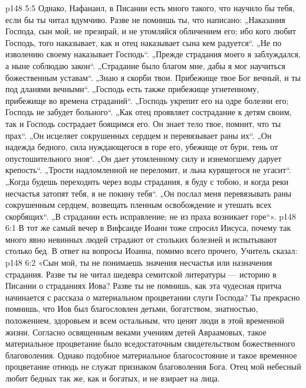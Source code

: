\vs p148 5:5 Однако, Нафанаил, в Писании есть много такого, что научило бы тебя, если бы ты читал вдумчиво. Разве не помнишь ты, что написано: „Наказания Господа, сын мой, не презирай, и не утомляйся обличением его; ибо кого любит Господь, того наказывает, как и отец наказывает сына кем радуется“. „Не по изволению своему наказывает Господь“. „Прежде страдания моего я заблуждался, а ныне соблюдаю закон“. „Страдание было благом мне, дабы я мог научиться божественным уставам“. „Знаю я скорби твои. Прибежище твое Бог вечный, и ты под дланями вечными“. „Господь есть также прибежище угнетенному, прибежище во времена страданий“. „Господь укрепит его на одре болезни его; Господь не забудет больного“. „Как отец проявляет сострадание к детям своим, так и Господь сострадает боящимся его. Он знает тело твое, помнит, что ты прах“. „Он исцеляет сокрушенных сердцем и перевязывает раны их“. „Он надежда бедного, сила нуждающегося в горе его, убежище от бури, тень от опустошительного зноя“. „Он дает утомленному силу и изнемогшему дарует крепость“. „Трости надломленной не переломит, и льна курящегося не угасит“. „Когда будешь переходить через воды страдания, я буду с тобою, и когда реки несчастья затопят тебя, я не покину тебя“. „Он послал меня перевязывать раны сокрушенным сердцем, возвещать пленным освобождение и утешать всех скорбящих“. „В страдании есть исправление; не из праха возникает горе“».
\vs p148 6:1 В тот же самый вечер в Вифсаиде Иоанн тоже спросил Иисуса, почему так много явно невинных людей страдают от стольких болезней и испытывают столько бед. В ответ на вопросы Иоанна, помимо всего прочего, Учитель сказал:
\vs p148 6:2 \pc «Сын мой, ты не понимаешь значения несчастья или назначения страдания. Разве ты не читал шедевра семитской литературы --- историю в Писании о страданиях Иова? Разве ты не помнишь, как эта чудесная притча начинается с рассказа о материальном процветании слуги Господа? Ты прекрасно помнишь, что Иов был благословлен детьми, богатством, знатностью, положением, здоровьем и всем остальным, что ценят люди в этой временной жизни. Согласно освященным веками учениям детей Авраамовых, такое материальное процветание было вседостаточным свидетельством божественного благоволения. Однако подобное материальное благосостояние и такое временное процветание отнюдь не служат признаком благоволения Бога. Отец мой небесный любит бедных так же, как и богатых, и не взирает на лица.
